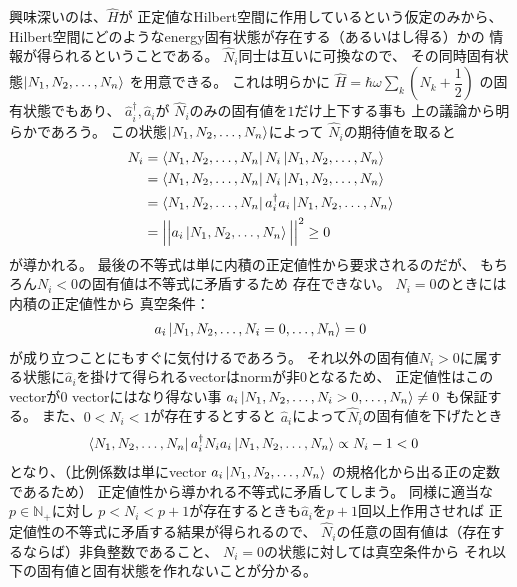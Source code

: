 興味深いのは、$ \hat{H} $が
正定値なHilbert空間に作用しているという仮定のみから、
Hilbert空間にどのようなenergy固有状態が存在する（あるいはし得る）かの
情報が得られるということである。
$\hat{N}_i$同士は互いに可換なので、
その同時固有状態$\ket{N_1, N_2,\dots, N_n}$
を用意できる。
これは明らかに
$ \hat{H} = \hbar\omega
\sum_k
\left(
    \hat{N}_k
    +
    \dfrac{ 1 }{ 2 }
\right) $
の固有状態でもあり、
$\hat{a}^\dagger_i, \hat{a}_i$が
$\hat{N}_i$のみの固有値を$1$だけ上下する事も
上の議論から明らかであろう。
この状態$\ket{N_1, N_2,\dots, N_n}$によって
$\hat{N}_i$の期待値を取ると
\begin{align}
    N_i &=
    \bra{N_1, N_2,\dots, N_n} N_i \ket{N_1, N_2,\dots, N_n}
\notag\\&=
    \bra{N_1, N_2,\dots, N_n} N_i \ket{N_1, N_2,\dots, N_n}
\notag\\&=
    \bra{N_1, N_2,\dots, N_n}
    a^\dagger_ia_i
    \ket{N_1, N_2,\dots, N_n}
\notag\\&=
    \Big|\Big|
        a_i \ket{N_1, N_2,\dots, N_n}
    \Big|\Big|^2 \ge 0
\label{positive definiteness of number operator}
\end{align}
が導かれる。
最後の不等式は単に内積の正定値性から要求されるのだが、
もちろん$N_i < 0$の固有値は不等式に矛盾するため
存在できない。
$N_i = 0$のときには内積の正定値性から
真空条件：
\begin{align}
    a_i \ket{N_1, N_2,\dots, N_i = 0,\dots, N_n} = 0
\label{vacuum of number operator}
\end{align}
が成り立つことにもすぐに気付けるであろう。
それ以外の固有値$N_i > 0$に属する状態に$\hat{a}_i$を掛けて得られるvectorはnormが非$0$となるため、
正定値性はこのvectorが$0$ vectorにはなり得ない事
$a_i \ket{N_1, N_2,\dots, N_i > 0,\dots, N_n} \neq 0$
も保証する。
また、$0<N_i<1$が存在するとすると
$\hat{a}_i$によって$\hat{N}_i$の固有値を下げたとき
\begin{align}
    \bra{N_1, N_2,\dots, N_n}
        a_i^\dagger N_i a_i
    \ket{N_1, N_2,\dots, N_n}
    &\propto
    N_i - 1 < 0
\end{align}
となり、（比例係数は単にvector
$a_i \ket{N_1, N_2,\dots, N_n}$
の規格化から出る正の定数であるため）
正定値性から導かれる不等式に矛盾してしまう。
同様に適当な$p\in\mathbb{N}_+$に対し
$p<N_i<p+1$が存在するときも$\hat{a}_i$を$p+1$回以上作用させれば
正定値性の不等式に矛盾する結果が得られるので、
$\hat{N}_i$の任意の固有値は（存在するならば）非負整数であること、
$N_i = 0$の状態に対しては真空条件から
それ以下の固有値と固有状態を作れないことが分かる。
